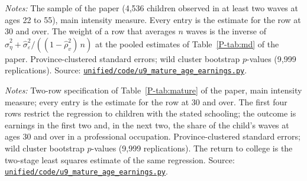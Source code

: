 \documentclass[11pt]{article}
\numberwithin{equation}{section}
\newcommand{\repourl}{https://github.com/JiachenJin1001/family-background-earnings-china}
\newcommand{\code}[1]{\href{\repourl/blob/main/#1}{\nolinkurl{#1}}}
\begin{document}
\begin{table}[H]
\centering
\small
\caption{The instrumented return to college at ages 30 and over: the
main specification and its variants.}
\label{oatab:variants}
\setlength{\tabcolsep}{4pt}
\resizebox{\ifdim\width>\textwidth\textwidth\else\width\fi}{!}{}
\par\smallskip
\begin{minipage}{0.94\textwidth}
\footnotesize\emph{Notes:} The sample of the paper (4,536 children
observed in at least two waves at ages 22 to 55), main intensity
measure. Every entry is the estimate for the row at 30 and over. The
weight of a row that averages $n$ waves is the inverse of
$\hat\sigma^2_\eta + \hat\sigma^2_\varepsilon / ((1 - \hat\rho_v^2)\, n)$
at the pooled estimates of Table~\ref{P-tab:md} of the paper.
Province-clustered standard errors; wild cluster bootstrap $p$-values
(9,999 replications). Source: \code{unified/code/u9_mature_age_earnings.py}.
\end{minipage}
\end{table}

\begin{table}[H]
\centering
\small
\caption{Checks of the earnings result at ages 30 and over.}
\label{oatab:maturechecks}
\setlength{\tabcolsep}{3.5pt}
\resizebox{\ifdim\width>\textwidth\textwidth\else\width\fi}{!}{}
\par\smallskip
\begin{minipage}{0.96\textwidth}
\footnotesize\emph{Notes:} Two-row specification of
Table~\ref{P-tab:mature} of the paper, main intensity measure; every
entry is the estimate for the row at 30 and over. The first four rows
restrict the regression to children with the stated schooling; the outcome is earnings in the first two and, in the next two, the share of the child's waves at ages 30 and over in a professional occupation.
Province-clustered standard errors; wild cluster bootstrap $p$-values
(9,999 replications). The return to college is the two-stage least
squares estimate of the same regression. Source:
\code{unified/code/u9_mature_age_earnings.py}.
\end{minipage}
\end{table}
\end{document}
